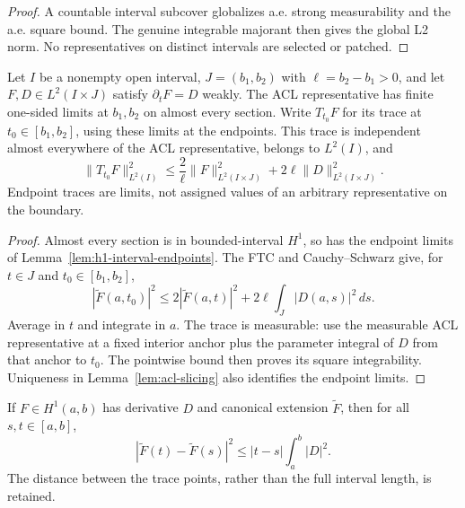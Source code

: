 \begin{proof}
\leanok
A countable interval subcover globalizes a.e. strong measurability and the
a.e. square bound. The genuine integrable majorant then gives the global
L2 norm. No representatives on distinct intervals are selected or patched.
\end{proof}

\begin{lemma}
\label{lem:trace-l2}
\leanok
Let $I$ be a nonempty open interval, $J=(b_1,b_2)$ with
$\ell=b_2-b_1>0$, and let $F,D\in L^2(I\times J)$ satisfy
$\partial_tF=D$ weakly. The ACL representative has finite one-sided
limits at $b_1,b_2$ on almost every section. Write $T_{t_0}F$ for its
trace at $t_0\in[b_1,b_2]$, using these limits at the endpoints.
This trace is independent almost everywhere of the ACL representative,
belongs to $L^2(I)$, and
\[
  \|T_{t_0}F\|_{L^2(I)}^2
  \le \frac{2}{\ell}\|F\|_{L^2(I\times J)}^2
       +2\ell\|D\|_{L^2(I\times J)}^2 .
\]
Endpoint traces are limits, not assigned values of an arbitrary
representative on the boundary.
\end{lemma}

\begin{proof}
\leanok
Almost every section is in bounded-interval $H^1$, so has the endpoint
limits of Lemma~\ref{lem:h1-interval-endpoints}. The FTC and
Cauchy--Schwarz give, for $t\in J$ and $t_0\in[b_1,b_2]$,
\[
  |\widetilde F(a,t_0)|^2
  \le 2|\widetilde F(a,t)|^2+2\ell\int_J|D(a,s)|^2\,ds .
\]
Average in $t$ and integrate in $a$. The trace is measurable: use the
measurable ACL representative at a fixed interior anchor plus the
parameter integral of $D$ from that anchor to $t_0$. The pointwise bound
then proves its square integrability. Uniqueness in
Lemma~\ref{lem:acl-slicing} also identifies the endpoint limits.
\end{proof}

\begin{lemma}
\label{lem:interval-trace-increment}
\leanok
If $F\in H^1(a,b)$ has derivative $D$ and canonical extension
$\widetilde F$, then for all $s,t\in[a,b]$,
\[
 |\widetilde F(t)-\widetilde F(s)|^2
 \le |t-s|\int_a^b|D|^2.
\]
The distance between the trace points, rather than the full interval length,
is retained.
\end{lemma}

